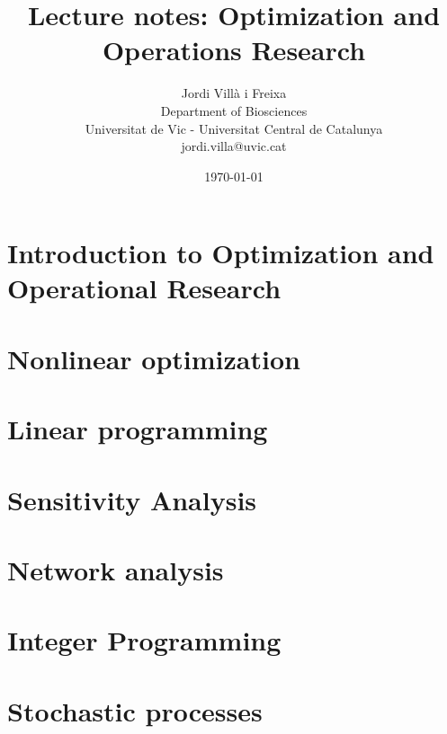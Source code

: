 \documentclass[10pt, a4paper, twoside]{book}
\title{Lecture notes: Optimization and Operations Research}
\author{Jordi Villà i Freixa\\Department of Biosciences\\Universitat de Vic - Universitat Central de Catalunya\\jordi.villa@uvic.cat}
\date{\today}
\begin{document}
\maketitle
\tableofcontents

\chapter{Introduction to Optimization and Operational Research}



\chapter{Nonlinear optimization}


\chapter{Linear programming}

%


\chapter{Sensitivity Analysis}


\chapter{Network analysis}


\chapter{Integer Programming}


\chapter{Stochastic processes}


\end{document}
